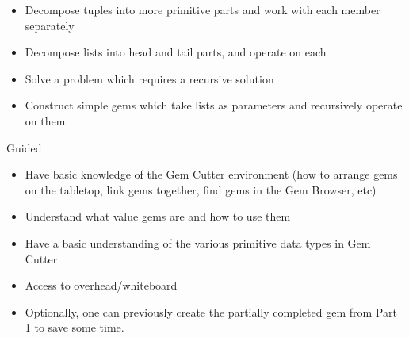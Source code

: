 
	{
		\begin{itemize}
			\item Decompose tuples into more primitive parts and work with each member separately
			\item Decompose lists into head and tail parts, and operate on each
			\item Solve a problem which requires a recursive solution
			\item Construct simple gems which take lists as parameters and recursively operate on them
		\end{itemize}
	}
	{Guided}
	{
		\begin{itemize}
			\item Have basic knowledge of the Gem Cutter environment (how to arrange gems on the tabletop, link gems together, find gems in the Gem Browser, etc)
			\item Understand what value gems are and how to use them
			\item Have a basic understanding of the various primitive data types in Gem Cutter
		\end{itemize}
	}
	{
		\begin{itemize}
			\item Access to overhead/whiteboard
			\item Optionally, one can previously create the partially completed gem from Part 1 to save some time.
		\end{itemize}
	}
